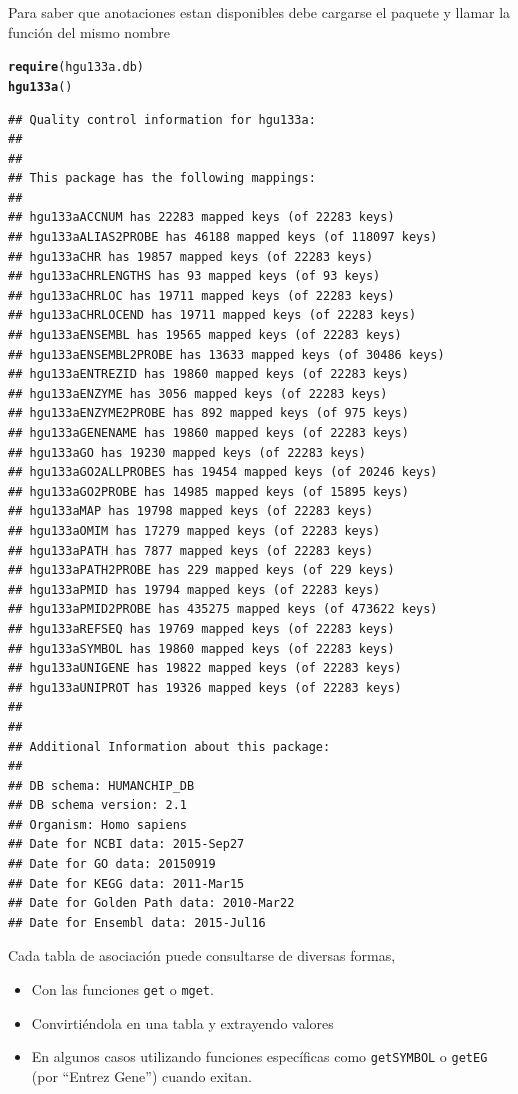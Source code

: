 \documentclass[a4paper]{article}\usepackage[]{graphicx}\usepackage[]{color}
\makeatletter
\newcommand{\hlstd}[1]{\textcolor[rgb]{0.345,0.345,0.345}{#1}}%
\newcommand{\hlkwd}[1]{\textcolor[rgb]{0.737,0.353,0.396}{\textbf{#1}}}%
\newenvironment{kframe}{%
 \def\at@end@of@kframe{}%
 \ifinner\ifhmode%
  \def\at@end@of@kframe{\end{minipage}}%
  \begin{minipage}{\columnwidth}%
 \fi\fi%
 \def\FrameCommand##1{\hskip\@totalleftmargin \hskip-\fboxsep
 \colorbox{shadecolor}{##1}\hskip-\fboxsep
     \hskip-\linewidth \hskip-\@totalleftmargin \hskip\columnwidth}%
 \MakeFramed {\advance\hsize-\width
   \@totalleftmargin\z@ \linewidth\hsize
   \@setminipage}}%
 {\par\unskip\endMakeFramed%
 \at@end@of@kframe}
\newenvironment{knitrout}{}{} %
\makeatother
\begin{document}
Para saber que anotaciones estan disponibles debe cargarse el paquete y llamar la función del mismo nombre 

\begin{knitrout}
\color{fgcolor}\begin{kframe}
\begin{alltt}
\hlkwd{require}\hlstd{(hgu133a.db)}
\hlkwd{hgu133a}\hlstd{()}
\end{alltt}
\begin{verbatim}
## Quality control information for hgu133a:
## 
## 
## This package has the following mappings:
## 
## hgu133aACCNUM has 22283 mapped keys (of 22283 keys)
## hgu133aALIAS2PROBE has 46188 mapped keys (of 118097 keys)
## hgu133aCHR has 19857 mapped keys (of 22283 keys)
## hgu133aCHRLENGTHS has 93 mapped keys (of 93 keys)
## hgu133aCHRLOC has 19711 mapped keys (of 22283 keys)
## hgu133aCHRLOCEND has 19711 mapped keys (of 22283 keys)
## hgu133aENSEMBL has 19565 mapped keys (of 22283 keys)
## hgu133aENSEMBL2PROBE has 13633 mapped keys (of 30486 keys)
## hgu133aENTREZID has 19860 mapped keys (of 22283 keys)
## hgu133aENZYME has 3056 mapped keys (of 22283 keys)
## hgu133aENZYME2PROBE has 892 mapped keys (of 975 keys)
## hgu133aGENENAME has 19860 mapped keys (of 22283 keys)
## hgu133aGO has 19230 mapped keys (of 22283 keys)
## hgu133aGO2ALLPROBES has 19454 mapped keys (of 20246 keys)
## hgu133aGO2PROBE has 14985 mapped keys (of 15895 keys)
## hgu133aMAP has 19798 mapped keys (of 22283 keys)
## hgu133aOMIM has 17279 mapped keys (of 22283 keys)
## hgu133aPATH has 7877 mapped keys (of 22283 keys)
## hgu133aPATH2PROBE has 229 mapped keys (of 229 keys)
## hgu133aPMID has 19794 mapped keys (of 22283 keys)
## hgu133aPMID2PROBE has 435275 mapped keys (of 473622 keys)
## hgu133aREFSEQ has 19769 mapped keys (of 22283 keys)
## hgu133aSYMBOL has 19860 mapped keys (of 22283 keys)
## hgu133aUNIGENE has 19822 mapped keys (of 22283 keys)
## hgu133aUNIPROT has 19326 mapped keys (of 22283 keys)
## 
## 
## Additional Information about this package:
## 
## DB schema: HUMANCHIP_DB
## DB schema version: 2.1
## Organism: Homo sapiens
## Date for NCBI data: 2015-Sep27
## Date for GO data: 20150919
## Date for KEGG data: 2011-Mar15
## Date for Golden Path data: 2010-Mar22
## Date for Ensembl data: 2015-Jul16
\end{verbatim}
\end{kframe}
\end{knitrout}

Cada tabla de asociación puede consultarse de diversas formas, 
\begin{itemize}
\item Con las funciones \texttt{get} o \texttt{mget}.
\item Convirtiéndola en una tabla y extrayendo valores
\item En algunos casos utilizando funciones específicas como \texttt{getSYMBOL} o \texttt{getEG} (por ``Entrez Gene'') cuando exitan.
\end{itemize}
\end{document}
